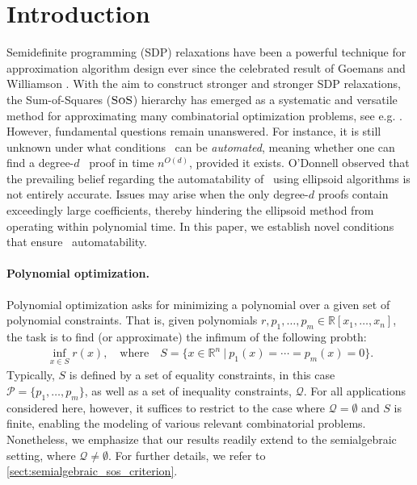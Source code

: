 \documentclass[11pt]{article}
\newcommand{\sos}{\text{\sc{SoS}}}
\newcommand{\1}{\textbf{1}}
\begin{document}
\section{Introduction}\label{sect:introduction}
Semidefinite programming (SDP) relaxations have been a powerful technique for approximation algorithm design ever since the celebrated result of Goemans and Williamson \cite{GoemansWilliamson1995}. With the aim to construct stronger and stronger SDP relaxations, the Sum-of-Squares ($\sos$) hierarchy has emerged as a systematic and versatile method for approximating many combinatorial optimization problems, see e.g. \cite{Lasserre2001, Parrilo03, FlemingKothariPitassi19, Laurent2009}.
However, fundamental questions remain unanswered. For instance, it is still unknown under what conditions \sos\ can be \emph{automated}, meaning whether one can find a degree-$d$ \sos\ proof in time $n^{O(d)}$, provided it exists.
O'Donnell \cite{odonnell2017} observed that the prevailing belief regarding the automatability of \sos\ using ellipsoid algorithms is not entirely accurate. Issues may arise when the only degree-$d$ proofs contain exceedingly large coefficients, thereby hindering the ellipsoid method from operating within polynomial time. 
In this paper, we establish novel conditions that ensure \sos\ automatability.

\paragraph{Polynomial optimization.}
Polynomial optimization asks for minimizing a polynomial over a given set of polynomial constraints. That is, given polynomials $r, p_1, \ldots, p_m \in \mathbb{R}[x_1, \ldots, x_n]$, the task is to find (or approximate) the infimum of the following probth:
\begin{align}\label{eqn:POP_formulation}
    \inf_{x\in S} r(x), \quad {\text{where}} \quad S=\{x\in \mathbb{R}^n \ | \ p_1(x)=\cdots=p_m(x)=0\}.
\end{align}
Typically, \( S \) is defined by a set of equality constraints, in this case \( \mathcal{P} = \{p_1, \ldots, p_m\}\), as well as a set of inequality constraints, \( \mathcal{Q} \). For all applications considered here, however, it suffices to restrict to the case where \( \mathcal{Q} = \emptyset \) and \( S \) is finite, enabling the modeling of various relevant combinatorial problems. Nonetheless, we emphasize that our results readily extend to the semialgebraic setting, where \( \mathcal{Q} \neq \emptyset \). For further details, we refer to \cref{sect:semialgebraic_sos_criterion}.
\end{document}
